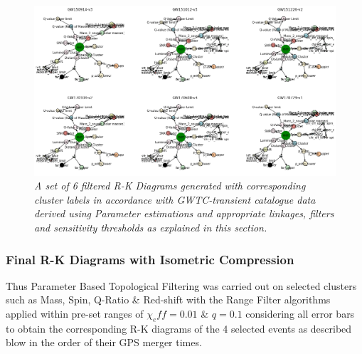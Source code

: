 \begin{figure}[t]
    \centering
        \includegraphics[width=1.0\linewidth]{images/Filtered CBC R-K Diagrams with Labels.png}
        \caption{\textit{A set of 6 filtered R-K Diagrams generated with corresponding cluster labels in accordance with GWTC-transient catalogue data derived using Parameter estimations and appropriate linkages, filters and sensitivity thresholds as explained in this section.}}
    \label{fig:CBC_RKD_with_Labels}
\end{figure}
    
    
\subsubsection{Final R-K Diagrams with Isometric Compression}
    
    
Thus Parameter Based Topological Filtering was carried out on selected clusters such as Mass, Spin, Q-Ratio \& Red-shift with the Range Filter algorithms applied within pre-set ranges of $\chi_eff=0.01$ \&  $q=0.1$  \cite{24.7_qvalueestimation} \cite{24.9_EffectiveSpin} \cite{00.6_LIGOAnalysisPipeline}considering all error bars to obtain the corresponding R-K diagrams of the 4 selected events as described blow in the order of their GPS merger times.

